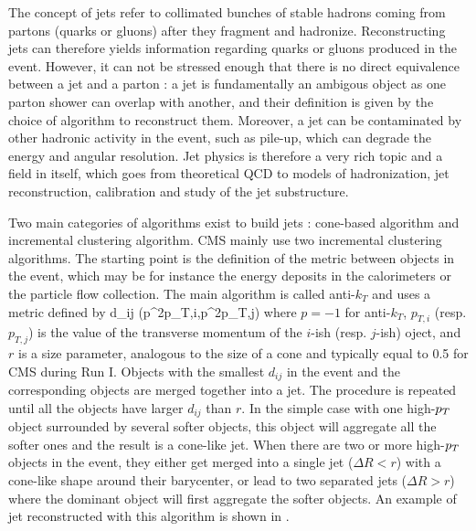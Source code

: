         The concept of jets refer to collimated bunches of stable hadrons coming from partons
        (quarks or gluons) after they fragment and hadronize. Reconstructing jets can
        therefore yields information regarding quarks or gluons produced in the event.
        However, it can not be stressed enough that there is no direct equivalence between
        a jet and a parton : a jet is fundamentally an ambigous object as one parton
        shower can overlap with another, and their definition is given by the choice
        of algorithm to reconstruct them. Moreover, a jet can be contaminated by other
        hadronic activity in the event, such as pile-up, which can degrade the energy
        and angular resolution. Jet physics is therefore a very rich topic and a field
        in itself, which goes from theoretical QCD to models of hadronization, jet
        reconstruction, calibration and study of the jet substructure.

        Two main categories of algorithms exist to build jets : cone-based algorithm and
        incremental clustering algorithm. CMS mainly use two incremental clustering
        algorithms. The starting point is the definition of the metric between objects in the
        event, which may be for instance the energy deposits in the calorimeters or the
        particle flow collection. The main algorithm is called anti-$k_T$ \cite{antiKt} and uses a metric
        defined by
        {
            d_{ij}  {}(p^{2p}_{T,i},p^{2p}_{T,j}) 
        }
        where $p = -1$ for anti-$k_T$, $p_{T,i}$ (resp. $p_{T,j}$) is the value of the transverse momentum of
        the $i$-ish (resp. $j$-ish) oject, and $r$ is a size parameter, analogous to the size of a cone and
        typically equal to 0.5 for CMS during Run I. Objects with the smallest
        $d_{ij}$ in the event and the corresponding objects are merged together into a
        jet. The procedure is repeated until all the objects have larger $d_{ij}$ than
        $r$. In the
        simple case with one high-$p_T$ object surrounded by several softer objects, this
        object will aggregate all the softer ones and the result is a cone-like jet. When
        there are two or more high-$p_T$ objects in the event, they either get merged into
        a single jet ($\Delta R < r$) with a cone-like shape around their barycenter, or
        lead to two separated jets ($\Delta R > r$) where the dominant object will first
        aggregate the softer objects. An example of jet reconstructed with this algorithm
        is shown in .


